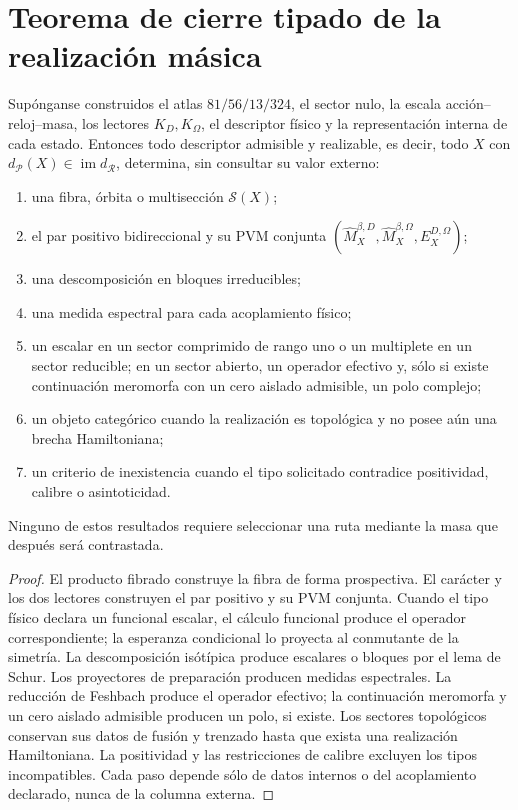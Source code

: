 \section{Teorema de cierre tipado de la realización másica}

\begin{theorem}
Supónganse construidos el atlas \(81/56/13/324\), el sector nulo, la escala
acción--reloj--masa, los lectores \(K_D,K_\Omega\), el descriptor físico y la
representación interna de cada estado. Entonces todo descriptor admisible y
realizable, es decir, todo \(X\) con
\(d_{\mathcal P}(X)\in\operatorname{im}d_{\mathcal R}\),
determina, sin consultar su valor externo:
\begin{enumerate}
\item una fibra, órbita o multisección \(\mathscr S(X)\);
\item el par positivo bidireccional y su PVM conjunta
      \((\widehat M_X^{\beta,D},\widehat M_X^{\beta,\Omega},
      E_X^{D,\Omega})\);
\item una descomposición en bloques irreducibles;
\item una medida espectral para cada acoplamiento físico;
\item un escalar en un sector comprimido de rango uno o un multiplete en un
      sector reducible; en un sector abierto, un operador efectivo y, sólo si
      existe continuación meromorfa con un cero aislado admisible, un polo
      complejo;
\item un objeto categórico cuando la realización es topológica y no posee aún
      una brecha Hamiltoniana;
\item un criterio de inexistencia cuando el tipo solicitado contradice
      positividad, calibre o asintoticidad.
\end{enumerate}
Ninguno de estos resultados requiere seleccionar una ruta mediante la masa
que después será contrastada.
\end{theorem}

\begin{proof}
El producto fibrado construye la fibra de forma prospectiva. El carácter y los
dos lectores construyen el par positivo y su PVM conjunta. Cuando el tipo
físico declara un funcional escalar, el cálculo funcional produce el operador
correspondiente; la esperanza condicional lo proyecta al conmutante de la
simetría. La descomposición isótípica produce escalares o bloques por el lema
de Schur. Los proyectores de preparación producen medidas espectrales. La
reducción de Feshbach produce el operador efectivo; la continuación meromorfa
y un cero aislado admisible producen un polo, si existe. Los sectores
topológicos conservan sus datos de fusión y trenzado hasta que exista una
realización Hamiltoniana. La positividad y las restricciones de calibre
excluyen los tipos incompatibles. Cada paso depende sólo de datos internos o
del acoplamiento declarado, nunca de la columna externa.
\end{proof}

